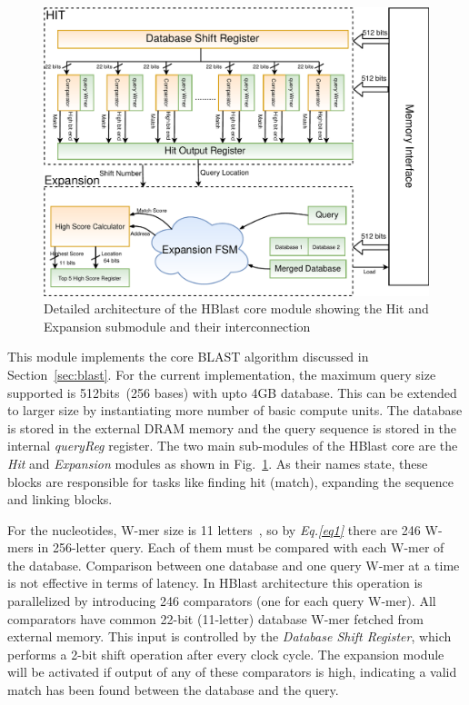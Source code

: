 \begin{figure}[t!]
\centering
\includegraphics[width=\columnwidth]{Figures/BlastMachine.pdf}
\caption{Detailed architecture of the HBlast core module showing the Hit and Expansion submodule and their interconnection} \label{fig:blastArch}
\end{figure}

This module implements the core BLAST algorithm discussed in Section~\ref{sec:blast}.
For the current implementation, the maximum query size supported is 512bits~(256 bases) with upto 4GB database. 
This can be extended to larger size by instantiating more number of basic compute units.
The database is stored in the external DRAM memory and the query sequence is stored in the internal \textit{queryReg} register.
The two main sub-modules of the HBlast core are the \textit{Hit} and \textit{Expansion} modules as shown in Fig.~\ref{fig:blastArch}. As their names state, these blocks are responsible for tasks like finding hit (match), expanding the sequence and linking blocks. 

For the nucleotides, W-mer size is 11 letters~\cite{kasap2008design}, so by \textit{Eq.\ref{eq1}} there are 246 W-mers in 256-letter query. 
Each of them must be compared with each W-mer of the database.  
Comparison between one database and one query W-mer at a time is not effective in terms of latency. 
In HBlast architecture this operation is parallelized by introducing 246 comparators (one for each query W-mer). 
All comparators have common 22-bit (11-letter) database W-mer fetched from external memory. 
This input is controlled by the \textit{Database Shift Register}, which performs a 2-bit shift operation after every clock cycle. 
The expansion module will be activated if output of any of these comparators is high, indicating a valid match has been found between the database and the query. 

